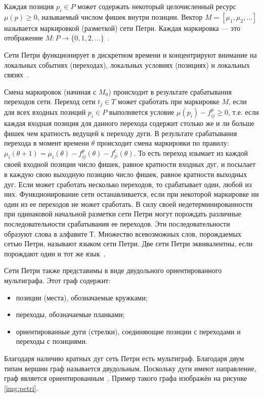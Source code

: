 Каждая позиция $p_i \in P$ может содержать некоторый целочисленный ресурс $\mu(p) \ge 0$, называемый числом фишек внутри позиции. Вектор $M = [\mu_1, \mu_2, \ldots]$ называется маркировкой (разметкой) сети Петри. Каждая маркировка --- это отображение $M: P \rightarrow \{0,1,2,\ldots\}$~\cite{petri}. 

Сети Петри функционирует в дискретном времени и концентрируют внимание на локальных событиях (переходах), локальных условиях (позициях) и локальных связях~\cite{petri}.

Смена маркировок (начиная с $M_0$) происходит в результате срабатывания переходов сети. Переход сети $t_j \in T$ может сработать при маркировке $M$, если для всех входных позиций $p_i \in P$ выполняется условие $\mu(p_i) - f_{ij}^p \ge 0$, т.е. если каждая входная позиция для данного перехода содержит столько же и ли больше фишек чем кратность ведущей к переходу дуги. В результате срабатывания перехода в момент времени $\theta$ происходит смена маркировки по правилу: $\mu_i(\theta + 1) = \mu_i(\theta) - f_{ij}^p(\theta) -  f_{ji}^t(\theta)$. То есть переход изымает из каждой своей входной позиции число фишек, равное кратности входных дуг, и посылает в каждую свою выходную позицию число фишек, равное кратности выходных дуг. Если может сработать несколько переходов, то срабатывает один, любой из них. Функционирование сети останавливается, если при некоторой маркировке ни один из ее переходов не может сработать. В силу своей недетерминированности при одинаковой начальной разметки сети Петри могут порождать различные последовательности срабатывания ее переходов. Эти последовательности образуют слова в алфавите Т. Множество всевозможных слов, порождаемых сетью Петри, называют языком сети Петри. Две сети Петри эквивалентны, если порождают один и тот же язык~\cite{petri}.

Сети Петри также представимы в виде двудольного ориентированного мультиграфа. Этот граф содержит:
\begin{itemize}[label=---]
	\item позиции (места), обозначаемые кружками;
	\item переходы, обозначаемые планками;
	\item ориентированные дуги (стрелки), соединяющие позиции с переходами и переходы с позициями.
\end{itemize}
Благодаря наличию кратных дуг сеть Петри есть мультиграф. Благодаря двум типам вершин граф называется двудольным. Поскольку дуги имеют направление, граф является ориентированным~\cite{petri}. Пример такого графа изображён на рисунке \ref{img:petri}.

